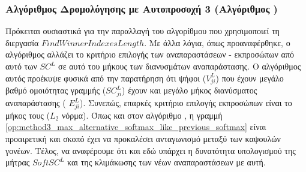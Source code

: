 \subsubsection{Αλγόριθμος Δρομολόγησης με Αυτο\textendash προσοχή 3 (Αλγόριθμος )}
Πρόκειται ουσιαστικά για την παραλλαγή του αλγορίθμου  που χρησιμοποιεί τη διεργασία $FindWinnerIndexesLength$. Με άλλα λόγια, όπως προαναφέρθηκε, ο αλγόριθμος  αλλάζει το κριτήριο επιλογής των αναπαραστάσεων - εκπροσώπων από αυτό των $SC^L$ σε αυτό του μήκους των διανυσμάτων αναπαράστασης. Ο αλγόριθμος αυτός προέκυψε φυσικά από την παρατήρηση ότι ψήφοι ($V^L_{ji}$) που έχουν μεγάλο βαθμό ομοιότητας γραμμής ($SC^L_{ji}$) έχουν και μεγάλο μήκος διανύσματος αναπαράστασης ( $E^L_{ji}$). Συνεπώς, επαρκές κριτήριο επιλογής εκπροσώπων είναι το μήκος τους ($L_2$ νόρμα). Όπως και στον αλγόριθμο , η γραμμή \ref{op:method3_max_alternative_softmax_like_previous_softmax} είναι προαιρετική και σκοπό έχει να προκαλέσει ανταγωνισμό μεταξύ των καψουλών γονέων. Τέλος, να αναφέρουμε ότι και εδώ υπάρχει η δυνατότητα υπολογισμού της μήτρας $SoftSC^L$ και της κλιμάκωσης των νέων αναπαραστάσεων με αυτή.


